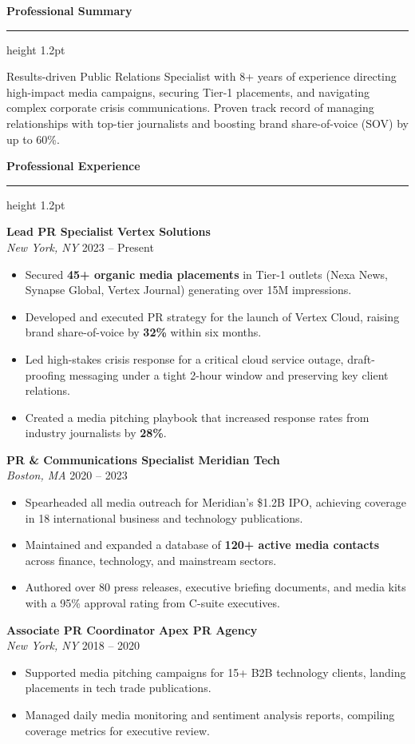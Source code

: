\documentclass[10pt]{article}
\newcommand{\sectiontitle}[1]{%
  \vspace{0.15cm}%
  {\large \bfseries \color{primary} #1}%
  \vspace{0.05cm}%
  {\color{secondary}\hrule height 1.2pt}%
  \vspace{0.1cm}%
}
\newcommand{\job}[4]{%
  \vspace{0.08cm}%
  {\bfseries \color{primary} #1} \hfill {\color{secondary} \bfseries #2} \\
  {\itshape \color{darktext} #3} \hfill {\small \color{darktext} #4} \\[0.02cm]
}
\begin{document}
\begin{minipage}[t]{0.66\textwidth}
  \sectiontitle{Professional Summary}
  {\small \color{darktext}
  Results-driven Public Relations Specialist with 8+ years of experience directing high-impact media campaigns, securing Tier-1 placements, and navigating complex corporate crisis communications. Proven track record of managing relationships with top-tier journalists and boosting brand share-of-voice (SOV) by up to 60\%.
  }

  \sectiontitle{Professional Experience}
  
  \job{Lead PR Specialist}{Vertex Solutions}{New York, NY}{2023 -- Present}
  \begin{itemize}[leftmargin=*,noitemsep,topsep=0pt,parsep=1pt,partopsep=0pt]
    \item Secured \textbf{45+ organic media placements} in Tier-1 outlets (Nexa News, Synapse Global, Vertex Journal) generating over 15M impressions.
    \item Developed and executed PR strategy for the launch of Vertex Cloud, raising brand share-of-voice by \textbf{32\%} within six months.
    \item Led high-stakes crisis response for a critical cloud service outage, draft-proofing messaging under a tight 2-hour window and preserving key client relations.
    \item Created a media pitching playbook that increased response rates from industry journalists by \textbf{28\%}.
  \end{itemize}

  \job{PR \& Communications Specialist}{Meridian Tech}{Boston, MA}{2020 -- 2023}
  \begin{itemize}[leftmargin=*,noitemsep,topsep=0pt,parsep=1pt,partopsep=0pt]
    \item Spearheaded all media outreach for Meridian's \$1.2B IPO, achieving coverage in 18 international business and technology publications.
    \item Maintained and expanded a database of \textbf{120+ active media contacts} across finance, technology, and mainstream sectors.
    \item Authored over 80 press releases, executive briefing documents, and media kits with a 95\% approval rating from C-suite executives.
  \end{itemize}

  \job{Associate PR Coordinator}{Apex PR Agency}{New York, NY}{2018 -- 2020}
  \begin{itemize}[leftmargin=*,noitemsep,topsep=0pt,parsep=1pt,partopsep=0pt]
    \item Supported media pitching campaigns for 15+ B2B technology clients, landing placements in tech trade publications.
    \item Managed daily media monitoring and sentiment analysis reports, compiling coverage metrics for executive review.
  \end{itemize}


\end{minipage}
\end{document}

